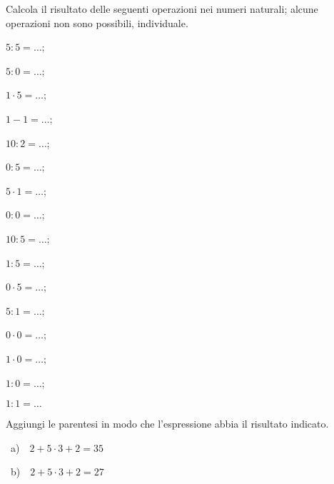\begin{esercizio}
Calcola il risultato delle seguenti operazioni nei numeri naturali; alcune operazioni non sono
possibili, individuale.
 \begin{multicols}{4}
 \begin{enumeratea}
 \item $5:5=\ldots$;
 \item $5:0=\ldots$;
 \item $1\cdot 5 =\ldots$;
 \item $1-1=\ldots$;
 \item $10:2=\ldots$;
 \item $0:5=\ldots$;
 \item $5\cdot1=\ldots$;
 \item $0:0=\ldots$;
 \item $10:5=\ldots$;
 \item $1:5=\ldots$;
 \item $0\cdot5=\ldots$;
 \item $5:1=\ldots$;
 \item $0\cdot0=\ldots$;
 \item $1\cdot0=\ldots$;
 \item $1:0=\ldots$;
 \item $1:1=\ldots$
 \end{enumeratea}
 \end{multicols}
\end{esercizio}

\begin{esercizio}[\Ast]
Aggiungi le parentesi in modo che l'espressione abbia il risultato indicato.
 \begin{multicols}{2}
 \begin{center}
 ~a)~~$2+5\cdot3+2=35$

 ~b)~~$2+5\cdot3+2=27$
 \end{center}
 \end{multicols}
\end{esercizio}

